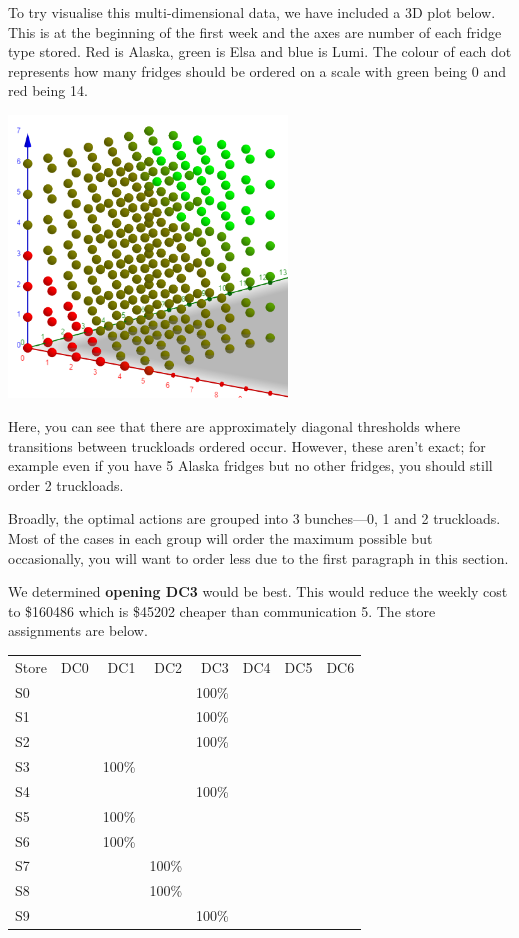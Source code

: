 \documentclass[11pt,a4paper]{article}
\begin{document}
To try visualise this multi-dimensional data, we have included a 3D plot below. 
This is at the beginning of the first week and the axes are number of each fridge type stored. Red is Alaska, green is Elsa 
and blue is Lumi. The colour of each dot represents how many fridges 
should be ordered on a scale with green being 0 and red being 14.
\begin{center}
\includegraphics[width=20em]{cube.png}
\end{center}
Here, you can see that there are approximately diagonal thresholds where 
transitions between truckloads ordered occur. However, these aren't exact; 
for example even if you have 5 Alaska fridges but no other fridges, you should 
still order 2 truckloads.

Broadly, the optimal actions are grouped into 3 bunches---0, 1 and 2 truckloads. 
Most of the cases in each group will order the maximum possible but 
occasionally, you will want to order less due to the first paragraph in this section.



We determined \textbf{opening DC3} would be best. This 
 would reduce the weekly cost to 
\$160486 which is \$45202 cheaper than communication 5. 
The store assignments are below. \\[1 em]
\begin{tabular}{l  r  r  r r r r r}
    Store & DC0 & DC1 & DC2 & DC3 & DC4 & DC5 & DC6 \\
    S0 &  &  &  & 100\% &  &  &  \\
    S1 &  &  &  & 100\% &  &  &  \\
    S2 &  &  &  & 100\% &  &  &  \\
    S3 &  & 100\% &  &  &  &  &  \\
    S4 &  &  &  & 100\% &  &  &  \\
    S5 &  & 100\% &  &  &  &  &  \\
    S6 &  & 100\% &  &  &  &  &  \\
    S7 &  &  & 100\% &  &  &  &  \\
    S8 &  &  & 100\% &  &  &  &  \\
    S9 &  &  &  & 100\% &  &  &  \\
\end{tabular}
\end{document}
